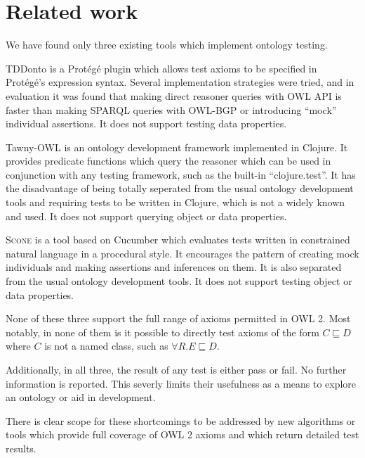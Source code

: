 \documentclass[paper.tex]{subfiles}
\begin{document}
\section{Related work}
\label{sec:related}

We have found only three existing tools which implement ontology testing.

TDDonto \cite{Lawrynowicz:TDDontoTool} is a Prot\'eg\'e plugin which allows test axioms to be specified in Prot\'eg\'e's expression syntax.
Several implementation strategies were tried, and in evaluation it was found that making direct reasoner queries with OWL API is faster than making SPARQL queries with OWL-BGP or introducing ``mock'' individual assertions.
It does not support testing data properties.

Tawny-OWL \cite{Warrender:HowWhatWhyTest} is an ontology development framework implemented in Clojure.
It provides predicate functions which query the reasoner which can be used in conjunction with any testing framework, such as the built-in ``clojure.test''.
It has the disadvantage of being totally seperated from the usual ontology development tools and requiring tests to be written in Clojure, which is not a widely known and used.
It does not support querying object or data properties.

\textsc{Scone} \cite{Scone:Bitbucket} is a tool based on Cucumber \cite{Cucumber} which evaluates tests written in constrained natural language in a procedural style.
It encourages the pattern of creating mock individuals and making assertions and inferences on them.
It is also separated from the usual ontology development tools.  It does not support testing object or data properties.

None of these three support the full range of axioms permitted in OWL 2.
Most notably, in none of them is it possible to directly test axioms of the form $C \sqsubseteq D$ where $C$ is not a named class, such as $\forall R.E \sqsubseteq D$.

Additionally, in all three, the result of any test is either pass or fail.
No further information is reported.
This severly limits their usefulness as a means to explore an ontology or aid in development.

There is clear scope for these shortcomings to be addressed by new algorithms or tools which provide full coverage of OWL 2 axioms and which return detailed test results.
\end{document}
